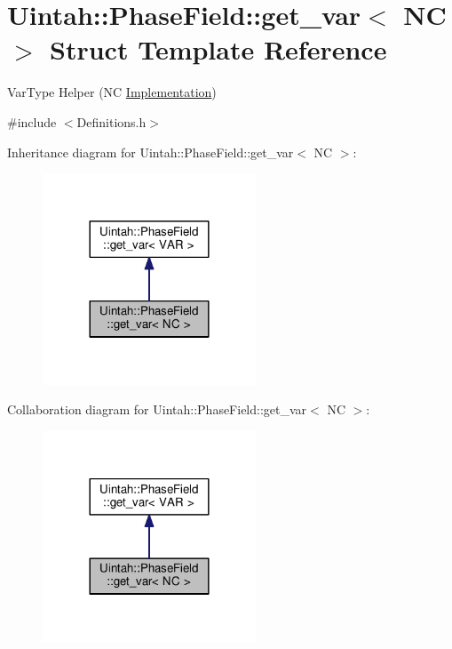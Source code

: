 \hypertarget{structUintah_1_1PhaseField_1_1get__var_3_01NC_01_4}{}\section{Uintah\+:\+:Phase\+Field\+:\+:get\+\_\+var$<$ NC $>$ Struct Template Reference}
\label{structUintah_1_1PhaseField_1_1get__var_3_01NC_01_4}


Var\+Type Helper (NC \hyperlink{classUintah_1_1PhaseField_1_1Implementation}{Implementation})  




{\ttfamily \#include $<$Definitions.\+h$>$}



Inheritance diagram for Uintah\+:\+:Phase\+Field\+:\+:get\+\_\+var$<$ NC $>$\+:\nopagebreak
\begin{figure}[H]
\begin{center}
\leavevmode
\includegraphics[width=180pt]{structUintah_1_1PhaseField_1_1get__var_3_01NC_01_4__inherit__graph}
\end{center}
\end{figure}


Collaboration diagram for Uintah\+:\+:Phase\+Field\+:\+:get\+\_\+var$<$ NC $>$\+:\nopagebreak
\begin{figure}[H]
\begin{center}
\leavevmode
\includegraphics[width=180pt]{structUintah_1_1PhaseField_1_1get__var_3_01NC_01_4__coll__graph}
\end{center}
\end{figure}
